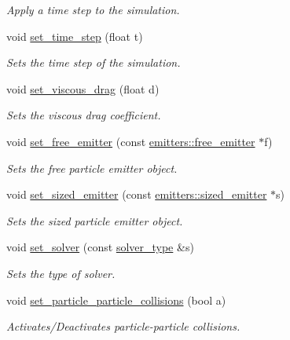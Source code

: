 \begin{DoxyCompactItemize}
\begin{DoxyCompactList}\small\item\em Apply a time step to the simulation. \end{DoxyCompactList}\item 
void \hyperlink{classphysim_1_1simulator_ab86bf6d22fd222a299183c9d82a71bc1}{set\+\_\+time\+\_\+step} (float t)
\begin{DoxyCompactList}\small\item\em Sets the time step of the simulation. \end{DoxyCompactList}\item 
void \hyperlink{classphysim_1_1simulator_a6e6fc481334928bdcb13fa309fb62748}{set\+\_\+viscous\+\_\+drag} (float d)
\begin{DoxyCompactList}\small\item\em Sets the viscous drag coefficient. \end{DoxyCompactList}\item 
void \hyperlink{classphysim_1_1simulator_a83ab26eaa30b62959f6afcb9ec58696f}{set\+\_\+free\+\_\+emitter} (const \hyperlink{classphysim_1_1emitters_1_1free__emitter}{emitters\+::free\+\_\+emitter} $\ast$f)
\begin{DoxyCompactList}\small\item\em Sets the free particle emitter object. \end{DoxyCompactList}\item 
void \hyperlink{classphysim_1_1simulator_a39882b752b51378a547bab344933c49e}{set\+\_\+sized\+\_\+emitter} (const \hyperlink{classphysim_1_1emitters_1_1sized__emitter}{emitters\+::sized\+\_\+emitter} $\ast$s)
\begin{DoxyCompactList}\small\item\em Sets the sized particle emitter object. \end{DoxyCompactList}\item 
void \hyperlink{classphysim_1_1simulator_ac0724a6950d7ce81793f8dbeafbfd08a}{set\+\_\+solver} (const \hyperlink{namespacephysim_a09adeda29c09e651877e880d31fc9686}{solver\+\_\+type} \&s)
\begin{DoxyCompactList}\small\item\em Sets the type of solver. \end{DoxyCompactList}\item 
void \hyperlink{classphysim_1_1simulator_a46208fce1548645f874618b44edde065}{set\+\_\+particle\+\_\+particle\+\_\+collisions} (bool a)
\begin{DoxyCompactList}\small\item\em Activates/\+Deactivates particle-\/particle collisions. \end{DoxyCompactList}\item 

\end{DoxyCompactItemize}
